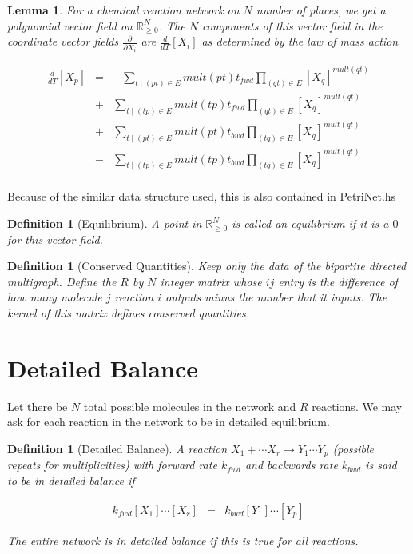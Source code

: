 \documentclass[11pt]{book}
\theoremstyle{change}
\newtheorem{definition}[equation]{Definition}
\newtheorem{lemma}[equation]{Lemma}
\theoremstyle{nonumberplain}
\numberwithin{equation}{section}
\begin{document}
\begin{lemma}
For a chemical reaction network on $N$ number of places, we get a polynomial vector field on $\mathbb{R}_{\geq 0}^N$. The $N$ components of this vector field in the coordinate vector fields $\frac{\partial}{\partial X_i}$ are $\frac{d}{dT} [X_i]$ as determined by the law of mass action

\begin{eqnarray*}
\frac{d}{dT} [X_p] &=& - \sum_{t \mid (pt) \in E}  mult(pt) t_{fwd} \prod_{(qt) \in E} [X_q]^{mult(qt)}\\
&+& \sum_{t \mid (tp) \in E} mult(tp) t_{fwd} \prod_{(qt) \in E} [X_q]^{mult(qt)}\\
&+& \sum_{t \mid (pt) \in E} mult(pt) t_{bwd} \prod_{(tq) \in E} [X_q]^{mult(qt)}\\
&-& \sum_{t \mid (tp) \in E} mult(tp) t_{bwd} \prod_{(tq) \in E} [X_q]^{mult(qt)}\\
\end{eqnarray*}

\end{lemma}

Because of the similar data structure used, this is also contained in PetriNet.hs

\begin{definition}[Equilibrium]
A point in $\mathbb{R}_{\geq 0}^N$ is called an equilibrium if it is a $0$ for this vector field.
\end{definition}

\begin{definition}[Conserved Quantities]
Keep only the data of the bipartite directed multigraph. Define the $R$ by $N$ integer matrix whose $ij$ entry is the difference of how many molecule $j$ reaction $i$ outputs minus the number that it inputs. The kernel of this matrix defines conserved quantities.
\end{definition}

\section{Detailed Balance}

Let there be $N$ total possible molecules in the network and $R$ reactions. We may ask for each reaction in the network to be in detailed equilibrium.

\begin{definition}[Detailed Balance]

A reaction $X_1 + \cdots X_r \to Y_1 \cdots Y_p$ (possible repeats for multiplicities) with forward rate $k_{fwd}$ and backwards rate $k_{bwd}$ is said to be in detailed balance if

\begin{eqnarray*}
k_{fwd} [X_1] \cdots [X_r] &=& k_{bwd} [Y_1] \cdots [Y_p]
\end{eqnarray*}

The entire network is in detailed balance if this is true for all reactions.
\end{definition}
\end{document}
